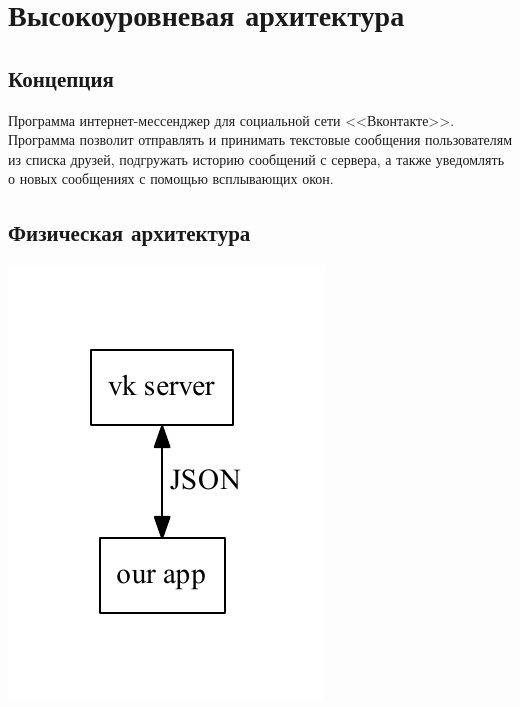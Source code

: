 \documentclass[12pt]{article}
\begin{document}

\tableofcontents{}



\newpage
\section{Высокоуровневая архитектура}
\subsection{Концепция}
Программа интернет-мессенджер для социальной сети <<Вконтакте>>. Программа позволит отправлять и принимать текстовые сообщения пользователям из списка друзей, подгружать историю сообщений с сервера, а также уведомлять о новых сообщениях с помощью всплывающих окон.

\subsection{Физическая архитектура}
\includegraphics{../HLA/diag/phys.pdf}
\end{document}
